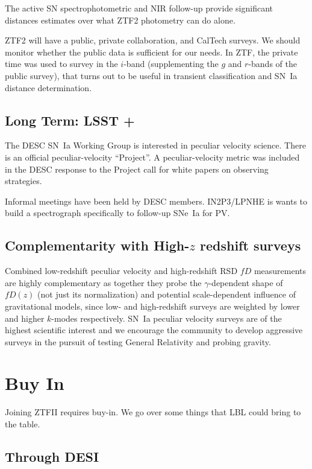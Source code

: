 \documentclass[11pt, oneside]{article}   	%
\begin{document}
The active SN spectrophotometric and NIR follow-up provide significant distances estimates over
what ZTF2 photometry can do alone.

ZTF2 will have a public, private collaboration, and CalTech surveys.  We should monitor whether the public data is sufficient for our needs.  In ZTF,
the private time was used to survey in the $i$-band (supplementing the $g$ and $r$-bands of the public survey), that turns out to be useful in transient classification and SN~Ia distance determination.

\subsection{Long Term: LSST +}
The DESC SN~Ia Working Group is interested in peculiar velocity science.  There is an official peculiar-velocity ``Project''.  A peculiar-velocity
metric was included in the DESC response to the Project call for white papers on observing strategies.

Informal meetings have been held by DESC members.
IN2P3/LPNHE is wants to build a spectrograph specifically to follow-up SNe~Ia for PV.

\subsection{Complementarity with High-$z$ redshift surveys}
Combined low-redshift peculiar velocity and high-redshift RSD $fD$ measurements are highly complementary as together they probe the
$\gamma$-dependent shape of $fD(z)$ (not just its normalization) and potential scale-dependent influence of gravitational models, since low-
and high-redshift surveys are weighted by lower and higher $k$-modes respectively.
SN~Ia peculiar velocity surveys are of the highest scientific
interest and we encourage
the community to develop aggressive surveys in the pursuit of testing  General Relativity and probing gravity. 

\section{Buy In}

Joining ZTFII requires buy-in.  We go over some things that LBL could bring to the table.

\subsection{Through DESI}
\end{document}
